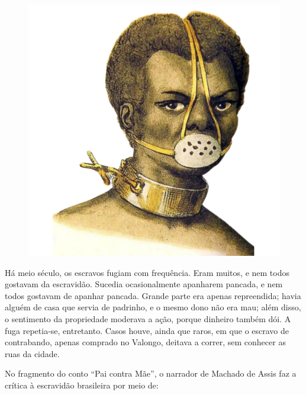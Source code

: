 \begin{myquote}

\begin{figure}[H]
\centering
\includegraphics[scale=0.25]{./imgSAEB_7_POR/media/image44.png}
\end{figure}

Há meio século, os escravos fugiam com frequência. Eram muitos, e nem todos
gostavam da escravidão. Sucedia ocasionalmente apanharem pancada, e nem todos
gostavam de apanhar pancada. Grande parte era apenas repreendida; havia alguém de
casa que servia de padrinho, e o mesmo dono não era mau; além disso, o sentimento da
propriedade moderava a ação, porque dinheiro também dói. A fuga repetia-se,
entretanto. Casos houve, ainda que raros, em que o escravo de contrabando, apenas
comprado no Valongo, deitava a correr, sem conhecer as ruas da cidade.


\end{myquote}

No fragmento do conto ``Pai contra Mãe'', o narrador de Machado de Assis faz a crítica
à escravidão brasileira por meio de:

